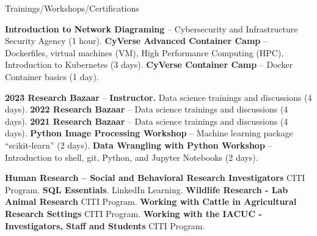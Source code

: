 \begin{rubric}{Trainings/Workshops/Certifications}

\entry*[4/2025] \textbf{Introduction to Network Diagraming} -- Cybersecurity and Infrastructure Security Agency (1 hour). \href{https://github.com/amantaya/CV/blob/master/certifications/SS107_APR1-2025_CertificateofAttendance.pdf}{\scriptsize\faLink}
\entry*[5/2022] \textbf{CyVerse Advanced Container Camp} -- Dockerfiles, virtual machines (VM), High Performance Computing (HPC), Introduction to Kubernetes (3 days).
\entry*[3/2021] \textbf{CyVerse Container Camp} -- Docker Container basics (1 day).

\entry*[4/2023] \textbf{2023 Research Bazaar} -- \textbf{Instructor.} Data science trainings and discussions (4 days).
\entry*[5/2022] \textbf{2022 Research Bazaar} -- Data science trainings and discussions (4 days).
\entry*[5/2021] \textbf{2021 Research Bazaar} -- Data science trainings and discussions (4 days).
\entry*[2/2020] \textbf{Python Image Processing Workshop} -- Machine learning package “scikit-learn” (2 days).
\entry*[2/2020] \textbf{Data Wrangling with Python Workshop} -- Introduction to shell, git, Python, and Jupyter Notebooks (2 days).

    \entry*[\emph{1/2024}]\textbf{Human Research -- Social and Behavioral Research Investigators} CITI Program. \href{https://github.com/amantaya/CV/blob/286493221d9eb7487b94547a68eb25f92f690e93/certifications/citi-Completion-Certificate_Human-Research_Social-Behavioral-Research-Inverstigators_Basic-Course.pdf}{\scriptsize\faLink}
    \entry*[7/2023] \textbf{SQL Essentials}. LinkedIn Learning. \href{https://github.com/amantaya/CV/blob/12c3c7c23746322f63703f2b4a97c45ef51b4da6/certifications/Certificate-Of-Completion-SQL-Essential-Training.pdf}{\scriptsize\faLink}
    \entry*[7/2021]\textbf{Wildlife Research - Lab Animal Research} CITI Program. \href{https://github.com/amantaya/CV/blob/286493221d9eb7487b94547a68eb25f92f690e93/certifications/citi-Completion-Certificate_Wildlife-Research_Wildlife-Research_Lab-Animal-Research.pdf}{\scriptsize\faLink}
    \entry*[7/2021]\textbf{Working with Cattle in Agricultural Research Settings} CITI Program. \href{https://github.com/amantaya/CV/blob/286493221d9eb7487b94547a68eb25f92f690e93/certifications/citi-Completion-Certificate_Working-with-Cattle-in-Agricultural-Research-Settings_Basic-Course.pdf}{\scriptsize\faLink}
    \entry*[7/2021]\textbf{Working with the IACUC - Investigators, Staff and Students} CITI Program. \href{https://github.com/amantaya/CV/blob/286493221d9eb7487b94547a68eb25f92f690e93/certifications/citi-Completion-Certificate_Working-with-the-IACUC_Working-with-the-IACUC-Investigators-Staff-Students_Basic-Course.pdf}{\scriptsize\faLink}

\end{rubric}
